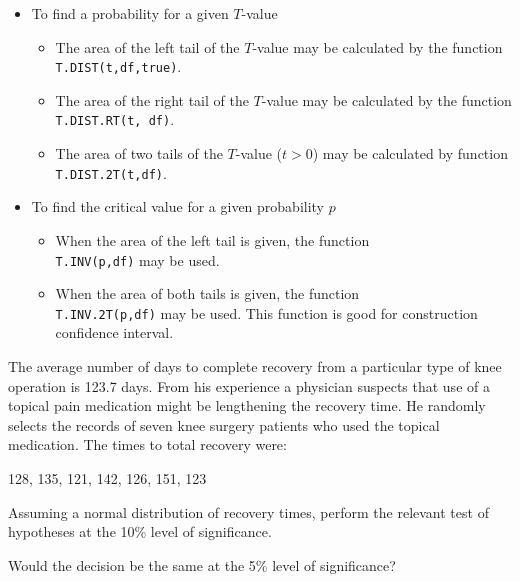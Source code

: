 \begin{itemize}
\item
  To find a probability for a given \(T\)-value

  \begin{itemize}
  \item
    The area of the left tail of the \(T\)-value may be calculated by
    the function \texttt{T.DIST(t,df,true)}.
  \item
    The area of the right tail of the \(T\)-value may be calculated by
    the function \texttt{T.DIST.RT(t,\ df)}.
  \item
    The area of two tails of the \(T\)-value
    (\(t > 0\)) may be calculated by
    function \texttt{T.DIST.2T(t,df)}.
  \end{itemize}
\item
  To find the critical value for a given probability \(p\)

  \begin{itemize}
  \item
    When the area of the left tail is given, the function\\
    \texttt{T.INV(p,df)} may be used.
  \item
    When the area of both tails is given, the function\\
    \texttt{T.INV.2T(p,df)} may be used. This function is good for
    construction confidence interval.
  \end{itemize}
\end{itemize}

\begin{exercise}

The average number of days to complete recovery from a particular type
of knee operation is 123.7 days. From his experience a physician
suspects that use of a topical pain medication might be lengthening the
recovery time. He randomly selects the records of seven knee surgery
patients who used the topical medication. The times to total recovery
were:

128, 135, 121, 142, 126, 151, 123

Assuming a normal distribution of recovery times, perform the relevant
test of hypotheses at the 10\% level of significance.

Would the decision be the same at the 5\% level of significance?

\end{exercise}


